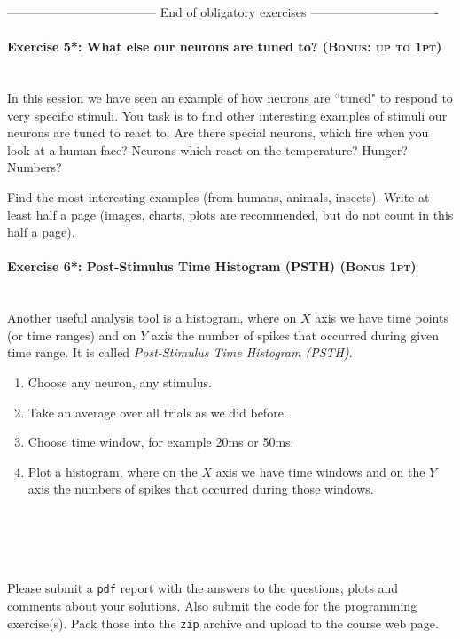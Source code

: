 \documentclass[a4paper,11pt]{article}
\newenvironment{exercise}[3]{\paragraph{Exercise #1: #2 \textsc{(#3pt)}}\ \\}{
\medskip}
\begin{document}
\vspace{1cm}
------------------------------------  End of obligatory exercises  -------------------------------

\vspace{1cm}

\begin{exercise}{5*}{What else our neurons are tuned to?}{Bonus: up to 1}
In this session we have seen an example of how neurons are ``tuned" to respond to very specific stimuli. You task is to find  other interesting examples of stimuli our neurons are tuned to react to. Are there special neurons, which fire when you look at a human face? Neurons which react on the temperature? Hunger? Numbers?

Find the most interesting examples (from  humans, animals, insects). Write at least half a page (images, charts, plots are recommended, but do not count in this half a page).
\end{exercise}


\begin{exercise}{6*}{Post-Stimulus Time Histogram (PSTH)}{Bonus 1}
Another useful analysis tool is a histogram, where on $X$ axis we have time points (or time ranges) and on $Y$ axis the number of spikes that occurred during given time range. It is called \emph{Post-Stimulus Time Histogram (PSTH)}.
\begin{enumerate}
	\item Choose any neuron, any stimulus.
	\item Take an average over all trials as we did before.
	\item Choose time window, for example 20ms or 50ms.
	\item Plot a histogram, where on the $X$ axis we have time windows and on the $Y$ axis the numbers of spikes that occurred during those windows.
\end{enumerate}
\end{exercise}


\ \\
\ \\
\ \\
\ \\
Please submit a \texttt{pdf} report with the answers to the questions, plots and comments about your solutions. Also submit the code for the programming exercise(s). Pack those into the \texttt{zip} archive and upload to the course web page.
\end{document}
